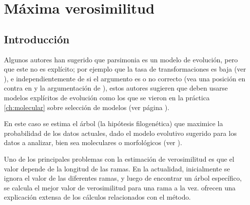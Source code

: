 \chapter{M\'axima verosimilitud}
\section*{Introducci\'on}
\label{ch:likelihood}

Algunos autores han sugerido que parsimonia es un modelo de 
evoluci\'on, pero que este no es expl\'icito; por ejemplo que la tasa 
de transformaciones es baja (ver \cite{Swofford1996, Felsenstein2004}), 
e independientemente de si el argumento es o no correcto (vea una 
posici\'on en contra en \cite{Farris1983} y la argumentaci\'on de 
\cite{Steel2002}), estos autores sugieren que deben usarse modelos 
expl\'icitos de evoluci\'on como los que se vieron en la pr\'actica 
\ref{ch:molecular} sobre selecci\'on de modelos (ver p\'agina 
\pageref{ch:molecular}).

En este caso se estima el \'arbol (la hip\'otesis filogen\'etica) que 
maximice la probabilidad de los datos actuales, dado el modelo 
evolutivo sugerido para los datos a  analizar, bien sea moleculares o 
morfol\'ogicos (ver \cite{Lewis2001}).

Uno de los principales problemas con la estimaci\'on de verosimilitud 
es que el valor depende de la longitud de las ramas. En la actualidad, 
inicialmente se ignora el valor de las diferentes ramas, y luego de 
encontrar un \'arbol espec\'ifico, se calcula el mejor valor de 
verosimilitud para una rama a la vez. \cite{Swofford1996} ofrecen una 
explicaci\'on extensa de los c\'alculos relacionados con el m\'etodo.



